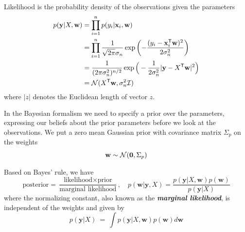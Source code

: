 \documentclass[10pt]{elegantbook}
\newcommand{\mydefination}[1]{\textbf{\textit{\textcolor{structurecolor}{#1}}}}
\begin{document}
\begin{definition}[Likelihood]
    Likelihood is the probability density of the observations given the parameters
    \begin{equation}
        \begin{aligned}
            p(\mathbf{y}|X,\mathbf{w}) &= \prod_{i=1}^{n}p(y_{i}|\mathbf{x}_{i},\mathbf{w}) \\
            &= \prod_{i=1}^{n}\frac{1}{\sqrt{2\pi}\sigma_{n}}\exp\left(-\frac{(y_{i}-\mathbf{x}_{i}^{\mathsf{T}}\mathbf{w})^{2}}{2\sigma_{n}^{2}}\right) \\
            &= \frac{1}{(2\pi\sigma_{n}^{2})^{n/2}}\exp\Big(-\frac{1}{2\sigma_{n}^{2}}|{\bf y}-X^{\mathsf{T}}{\bf w}|^{2}\Big) \\
            &= {\cal N}(X^{\mathsf{T}}{\bf w},\sigma_{n}^{2}{\cal I})
        \end{aligned}
    \end{equation}
    where $|z|$ denotes the Euclidean length of vector $z$.
\end{definition}

In the Bayesian formalism
we need to specify a prior over the parameters, expressing our beliefs about the prior
parameters before we look at the observations. We put a zero mean Gaussian
prior with covariance matrix $\Sigma_p$ on the weights
\begin{equation}
    {\bf w}\sim{\mathcal N}({\bf0},\Sigma_{p})
\end{equation}

\begin{definition}[Posterior]
    Based on Bayes' rule, we have
    \begin{equation}
        \text{posterior} = \frac{\text{likelihood} \times \text{prior}}{\text{marginal likelihood}}, \quad 
        p(\mathbf{w}|\mathbf{y},X) = {\frac{p(\mathbf{y}|X,\mathbf{w})p(\mathbf{w})}{p(\mathbf{y}|X)}}
    \end{equation}
    where the normalizing constant, also known as the \mydefination{marginal likelihood}, is independent of the weights and given by
    \begin{equation}
        p(\mathbf{y}|X)\ =\ \int p(\mathbf{y}|X,\mathbf{w})p(\mathbf{w})d\mathbf{w}
    \end{equation}
\end{definition}
\end{document}

